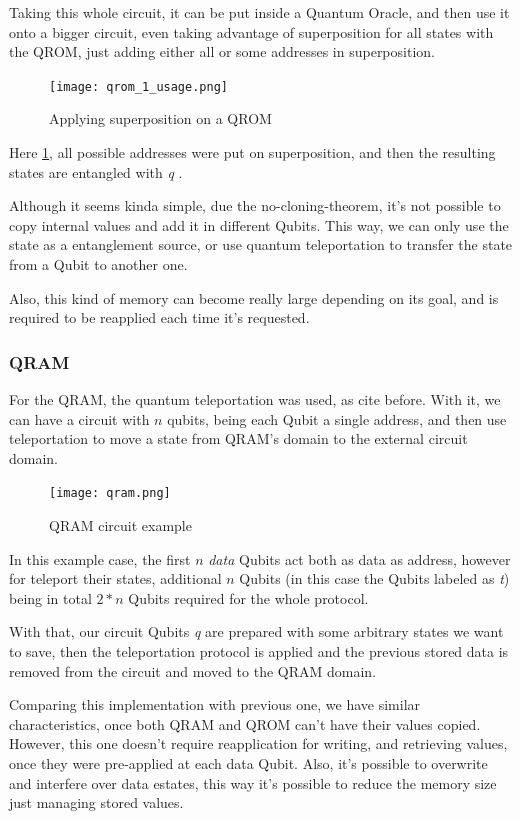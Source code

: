 \documentclass{article}
\begin{document}
Taking this whole circuit, it can be put inside a Quantum Oracle, and then use it onto a bigger circuit, even taking advantage of superposition for all states with the QROM, just adding either all or some addresses in superposition.

\begin{figure}[h]
	\centering
	\texttt{[image: qrom\_1\_usage.png]}
	\caption{Applying superposition on a QROM}
	\label{fig:qrom-usage}
\end{figure}

Here \ref{fig:qrom-usage}, all possible addresses were put on superposition, and then the resulting states are entangled with \emph{q} .

Although it seems kinda simple, due the no-cloning-theorem, it's not possible to copy internal values and add it in different Qubits. This way, we can only use the state as a entanglement source, or use quantum teleportation to transfer the state from a Qubit to another one.

Also, this kind of memory can become really large depending on its goal, and is required to be reapplied each time it's requested.

\subsubsection{QRAM}

For the QRAM, the quantum teleportation was used, as cite before. With it, we can have a circuit with $n$ qubits, being each Qubit a single address, and then use teleportation to move a state from QRAM's domain to the external circuit domain.

 \begin{figure}[h]
 	\centering
 	\texttt{[image: qram.png]}
 	\caption{QRAM circuit example}
 	\label{fig:qram}
 \end{figure}

In this example case, the first $n$ \emph{data} Qubits act both as data as address, however for teleport their states, additional $n$ Qubits (in this case the Qubits labeled as \emph{t}) being in total $2*n$ Qubits required for the whole protocol.

With that, our circuit Qubits \emph{q} are prepared with some arbitrary states we want to save, then the teleportation protocol is applied and the previous stored data is removed from the circuit and moved to the QRAM domain.

Comparing this implementation with previous one, we have similar characteristics, once both QRAM and QROM can't have their values copied. However, this one doesn't require reapplication for writing, and retrieving values, once they were pre-applied at each data Qubit. Also, it's possible to overwrite and interfere over data estates, this way it's possible to reduce the memory size just managing stored values.
\end{document}
